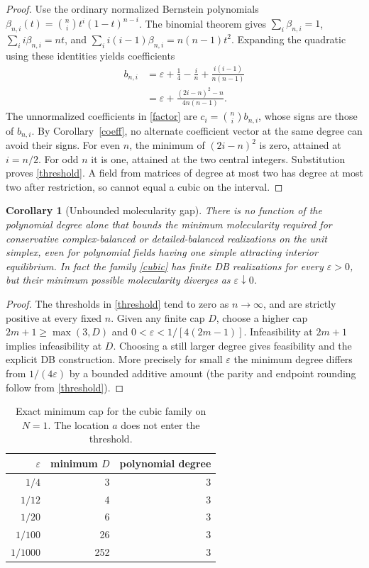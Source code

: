 \documentclass[11pt]{article}
\newtheorem{corollary}[theorem]{Corollary}
\begin{document}
\begin{proof}
Use the ordinary normalized Bernstein polynomials $\beta_{n,i}(t)=\binom ni t^i(1-t)^{n-i}$. The binomial theorem gives $\sum_i\beta_{n,i}=1$, $\sum_i i\beta_{n,i}=nt$, and $\sum_i i(i-1)\beta_{n,i}=n(n-1)t^2$. Expanding the quadratic using these identities yields coefficients
\begin{align*}
b_{n,i}&=\varepsilon+\tfrac14-\frac{i}{n}+\frac{i(i-1)}{n(n-1)}\\
&=\varepsilon+\frac{(2i-n)^2-n}{4n(n-1)}.
\end{align*}
The unnormalized coefficients in \eqref{factor} are $c_i=\binom ni b_{n,i}$, whose signs are those of $b_{n,i}$. By Corollary~\ref{coeff}, no alternate coefficient vector at the same degree can avoid their signs. For even $n$, the minimum of $(2i-n)^2$ is zero, attained at $i=n/2$. For odd $n$ it is one, attained at the two central integers. Substitution proves \eqref{threshold}. A field from matrices of degree at most two has degree at most two after restriction, so cannot equal a cubic on the interval.
\end{proof}
\begin{corollary}[Unbounded molecularity gap]\label{gap}
There is no function of the polynomial degree alone that bounds the minimum molecularity required for conservative complex-balanced or detailed-balanced realizations on the unit simplex, even for polynomial fields having one simple attracting interior equilibrium. In fact the family \eqref{cubic} has finite DB realizations for every $\varepsilon>0$, but their minimum possible molecularity diverges as $\varepsilon\downarrow0$.
\end{corollary}
\begin{proof}
The thresholds in \eqref{threshold} tend to zero as $n\to\infty$, and are strictly positive at every fixed $n$. Given any finite cap $D$, choose a higher cap $2m+1\geq\max(3,D)$ and $0<\varepsilon<1/[4(2m-1)]$. Infeasibility at $2m+1$ implies infeasibility at $D$. Choosing a still larger degree gives feasibility and the explicit DB construction. More precisely for small $\varepsilon$ the minimum degree differs from $1/(4\varepsilon)$ by a bounded additive amount (the parity and endpoint rounding follow from \eqref{threshold}).
\end{proof}

\begin{table}[ht]
\centering
\caption{Exact minimum cap for the cubic family on $N=1$. The location $a$ does not enter the threshold.}
\begin{tabular}{rrr}
\toprule
$\varepsilon$ & minimum $D$ & polynomial degree\\
\midrule
$1/4$ & 3 & 3\\
$1/12$ & 4 & 3\\
$1/20$ & 6 & 3\\
$1/100$ & 26 & 3\\
$1/1000$ & 252 & 3\\
\bottomrule
\end{tabular}
\end{table}
\end{document}
